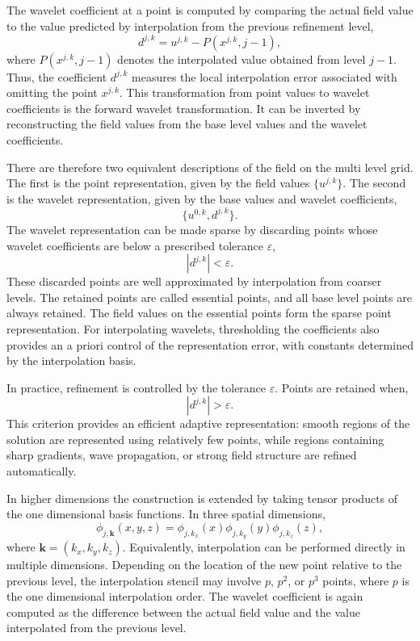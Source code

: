 The wavelet coefficient at a point is computed by comparing the actual field value to the value predicted by interpolation from the previous refinement level,
\begin{equation}
    d^{j,k}
    =
    u^{j,k}
    -
    P\!\left(x^{j,k},j-1\right),
\end{equation}
where $P(x^{j,k},j-1)$ denotes the interpolated value obtained from level $j-1$. Thus, the coefficient $d^{j,k}$ measures the local interpolation error associated with omitting the point $x^{j,k}$. This transformation from point values to wavelet coefficients is the forward wavelet transformation. It can be inverted by reconstructing the field values from the base level values and the wavelet coefficients.

There are therefore two equivalent descriptions of the field on the multi level grid. The first is the point representation, given by the field values $\{u^{j,k}\}$. The second is the wavelet representation, given by the base values and wavelet coefficients,
\begin{equation}
    \{u^{0,k},d^{j,k}\}.
\end{equation}
The wavelet representation can be made sparse by discarding points whose wavelet coefficients are below a prescribed tolerance $\varepsilon$,
\begin{equation}
    |d^{j,k}| < \varepsilon .
\end{equation}
These discarded points are well approximated by interpolation from coarser levels. The retained points are called essential points, and all base level points are always retained. The field values on the essential points form the sparse point representation. For interpolating wavelets, thresholding the coefficients also provides an a priori control of the representation error, with constants determined by the interpolation basis.

In practice, refinement is controlled by the tolerance $\varepsilon$. Points are retained when,
\begin{equation}
    |d^{j,k}| > \varepsilon .
\end{equation}
This criterion provides an efficient adaptive representation: smooth regions of the solution are represented using relatively few points, while regions containing sharp gradients, wave propagation, or strong field structure are refined automatically.

In higher dimensions the construction is extended by taking tensor products of the one dimensional basis functions. In three spatial dimensions,
\begin{equation}
    \phi_{j,\mathbf{k}}(x,y,z)
    =
    \phi_{j,k_x}(x)
    \phi_{j,k_y}(y)
    \phi_{j,k_z}(z),
\end{equation}
where $\mathbf{k}=(k_x,k_y,k_z)$. Equivalently, interpolation can be performed directly in multiple dimensions. Depending on the location of the new point relative to the previous level, the interpolation stencil may involve $p$, $p^2$, or $p^3$ points, where $p$ is the one dimensional interpolation order. The wavelet coefficient is again computed as the difference between the actual field value and the value interpolated from the previous level.


